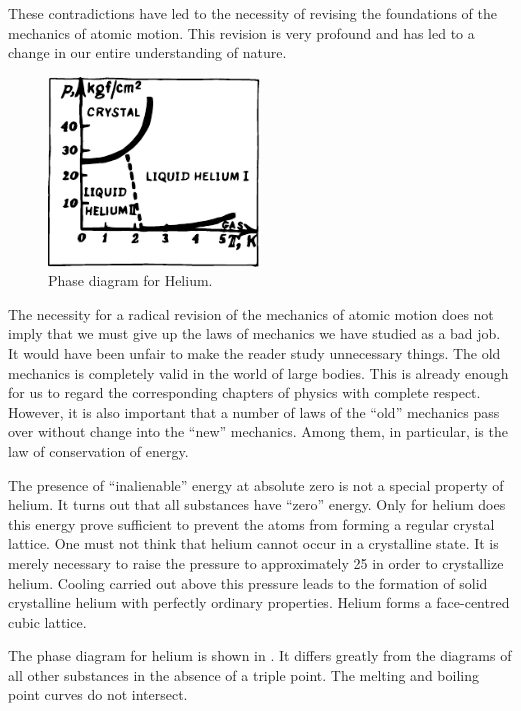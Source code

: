 These contradictions have led to the necessity of revis­ing the foundations of the mechanics of atomic motion. This revision is very profound and has led to a change in our entire understanding of nature.
\begin{figure}[!h]
\centering
\includegraphics[width=0.5\textwidth]{figures/fig-04-14.pdf}
\caption{Phase diagram for Helium.}
\label{fig-4.14}
\end{figure}


The necessity for a radical revision of the mechanics of atomic motion does not imply that we must give up the laws of mechanics we have studied as a bad job. It would have been unfair to make the reader study unnecessary things. The old mechanics is completely valid in the world of large bodies. This is already enough for us to regard the corresponding chapters of physics with complete respect. However, it is also important that a number of laws of the ``old'' mechanics pass over without change into the ``new'' mechanics. Among them, in particular, is the law of conservation of energy.

The presence of ``inalienable'' energy at absolute zero is not a special property of helium. It turns out that all substances have ``zero'' energy. Only for helium does this energy prove sufficient to prevent the atoms from forming a regular crystal lattice.
One must not think that helium cannot occur in a crys­talline state. It is merely necessary to raise the pressure to approximately \SI{25}{\atmos} in order to crystallize helium. Cooling carried out above this pressure leads to the for­mation of solid crystalline helium with perfectly ordinary properties. Helium forms a face-centred cubic lattice.

The phase diagram for helium is shown in . It differs greatly from the diagrams of all other sub­stances in the absence of a triple point. The melting and boiling point curves do not intersect.